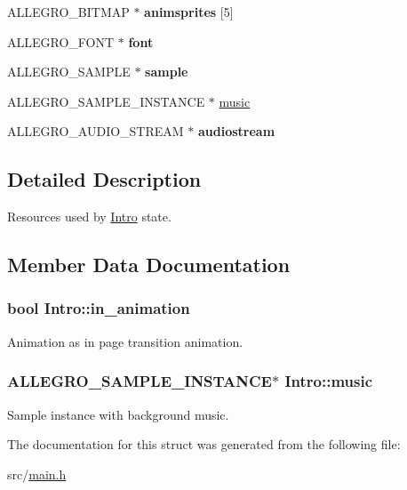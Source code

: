 \begin{DoxyCompactItemize}
\item 
\hypertarget{structIntro_ae89a2ad7dfed9e06a558a5f92bba55bc}{\-A\-L\-L\-E\-G\-R\-O\-\_\-\-B\-I\-T\-M\-A\-P $\ast$ {\bfseries animsprites} \mbox{[}5\mbox{]}}\label{structIntro_ae89a2ad7dfed9e06a558a5f92bba55bc}

\item 
\hypertarget{structIntro_a896d4fdd74cf47535173eeaa6e81f734}{\-A\-L\-L\-E\-G\-R\-O\-\_\-\-F\-O\-N\-T $\ast$ {\bfseries font}}\label{structIntro_a896d4fdd74cf47535173eeaa6e81f734}

\item 
\hypertarget{structIntro_a0189475d44f8e19e6fe543371a9daedb}{\-A\-L\-L\-E\-G\-R\-O\-\_\-\-S\-A\-M\-P\-L\-E $\ast$ {\bfseries sample}}\label{structIntro_a0189475d44f8e19e6fe543371a9daedb}

\item 
\-A\-L\-L\-E\-G\-R\-O\-\_\-\-S\-A\-M\-P\-L\-E\-\_\-\-I\-N\-S\-T\-A\-N\-C\-E $\ast$ \hyperlink{structIntro_a461ce3f44fd4f7d2d3713e2f31c1d1ec}{music}
\item 
\hypertarget{structIntro_a879aa48597b2f7b6fbeb9f9911234350}{\-A\-L\-L\-E\-G\-R\-O\-\_\-\-A\-U\-D\-I\-O\-\_\-\-S\-T\-R\-E\-A\-M $\ast$ {\bfseries audiostream}}\label{structIntro_a879aa48597b2f7b6fbeb9f9911234350}

\end{DoxyCompactItemize}


\subsection{\-Detailed \-Description}
\-Resources used by \hyperlink{structIntro}{\-Intro} state. 

\subsection{\-Member \-Data \-Documentation}
\hypertarget{structIntro_a2876fd8a7bfd940c3936eb6445984a22}{
\subsubsection[{in\-\_\-animation}]{\setlength{\rightskip}{0pt plus 5cm}bool {\bf \-Intro\-::in\-\_\-animation}}}\label{structIntro_a2876fd8a7bfd940c3936eb6445984a22}
\-Animation as in page transition animation. \hypertarget{structIntro_a461ce3f44fd4f7d2d3713e2f31c1d1ec}{
\subsubsection[{music}]{\setlength{\rightskip}{0pt plus 5cm}\-A\-L\-L\-E\-G\-R\-O\-\_\-\-S\-A\-M\-P\-L\-E\-\_\-\-I\-N\-S\-T\-A\-N\-C\-E$\ast$ {\bf \-Intro\-::music}}}\label{structIntro_a461ce3f44fd4f7d2d3713e2f31c1d1ec}
\-Sample instance with background music. 

\-The documentation for this struct was generated from the following file\-:\begin{DoxyCompactItemize}
\item 
src/\hyperlink{main_8h}{main.\-h}\end{DoxyCompactItemize}
